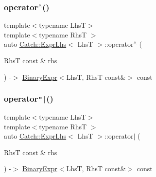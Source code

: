 \mbox{\label{class_catch_1_1_expr_lhs_aecefc9a1b4bf4f8fa8882fda04d60fb4}} 
\subsubsection{\texorpdfstring{operator$^\wedge$()}{operator^()}}
{\footnotesize\ttfamily template$<$typename LhsT$>$ \\
template$<$typename RhsT $>$ \\
auto \mbox{\hyperlink{class_catch_1_1_expr_lhs}{Catch\+::\+Expr\+Lhs}}$<$ LhsT $>$\+::operator$^\wedge$ (\begin{DoxyParamCaption}\item[{RhsT const \&}]{rhs }\end{DoxyParamCaption}) -\/$>$ \mbox{\hyperlink{class_catch_1_1_binary_expr}{Binary\+Expr}}$<$LhsT, RhsT const\&$>$ const \hspace{0.3cm}{\ttfamily [inline]}}

\mbox{\label{class_catch_1_1_expr_lhs_a764131057e79fd458ee1a8062f8c8732}} 
\subsubsection{\texorpdfstring{operator\texttt{"|}()}{operator|()}}
{\footnotesize\ttfamily template$<$typename LhsT$>$ \\
template$<$typename RhsT $>$ \\
auto \mbox{\hyperlink{class_catch_1_1_expr_lhs}{Catch\+::\+Expr\+Lhs}}$<$ LhsT $>$\+::operator$\vert$ (\begin{DoxyParamCaption}\item[{RhsT const \&}]{rhs }\end{DoxyParamCaption}) -\/$>$ \mbox{\hyperlink{class_catch_1_1_binary_expr}{Binary\+Expr}}$<$LhsT, RhsT const\&$>$ const \hspace{0.3cm}{\ttfamily [inline]}}

\mbox{\label{class_catch_1_1_expr_lhs_a33e5f813f5c236b9b77d977c04266f4d}} 
